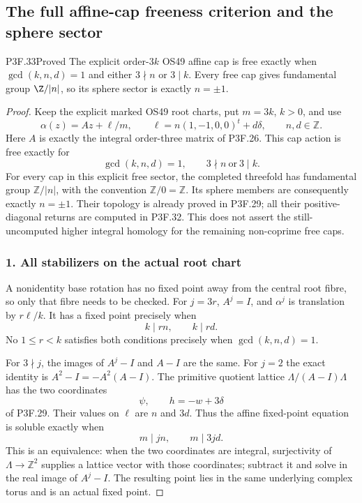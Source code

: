 \subsection{The full affine-cap freeness criterion and the sphere sector}
\begin{statement}{P3F.33}{Proved}
The explicit order-$3k$ OS49 affine cap is free exactly when $\gcd(k,n,d)=1$ and either $3\nmid n$ or $3\mid k$. Every free cap gives fundamental group $\Z/|n|$, so its sphere sector is exactly $n=\pm1$.
\end{statement}
\begin{proof}
Keep the explicit marked OS49 root charts, put \(m=3k\), \(k>0\), and use \[
 \alpha(z)=Az+\ell/m,\qquad
 \ell=n(1,-1,0,0)^t+d\delta,\qquad n,d\in\mathbb Z.
\] Here \(A\) is exactly the integral order-three matrix of P3F.26. This cap action is free exactly for \[
 \gcd(k,n,d)=1,\qquad
 3\nmid n\ \text{or}\ 3\mid k.                 \tag{P3F.33.1}
\] For every cap in this explicit free sector, the completed threefold has fundamental group \(\mathbb Z/|n|\), with the convention \(\mathbb Z/0=\mathbb Z\). Its sphere members are consequently exactly \(n=\pm1\). Their topology is already proved in P3F.29; all their positive-diagonal returns are computed in P3F.32. This does not assert the still-uncomputed higher integral homology for the remaining non-coprime free caps.

\subsubsection{1. All stabilizers on the actual root chart}\label{all-stabilizers-on-the-actual-root-chart}

A nonidentity base rotation has no fixed point away from the central root fibre, so only that fibre needs to be checked. For \(j=3r\), \(A^j=I\), and \(\alpha^j\) is translation by \(r\ell/k\). It has a fixed point precisely when \[
 k\mid rn,\qquad k\mid rd.
\] No \(1\leq r<k\) satisfies both conditions precisely when \(\gcd(k,n,d)=1\).

For \(3\nmid j\), the images of \(A^j-I\) and \(A-I\) are the same. For \(j=2\) the exact identity is \(A^2-I=-A^2(A-I)\). The primitive quotient lattice \(\Lambda/(A-I)\Lambda\) has the two coordinates \[
 \psi,\qquad h=-w+3\delta
\] of P3F.29. Their values on \(\ell\) are \(n\) and \(3d\). Thus the affine fixed-point equation is soluble exactly when \[
 m\mid jn,\qquad m\mid3jd.                     \tag{P3F.33.2}
\] This is an equivalence: when the two coordinates are integral, surjectivity of \(\Lambda\to\mathbb Z^2\) supplies a lattice vector with those coordinates; subtract it and solve in the real image of \(A^j-I\). The resulting point lies in the same underlying complex torus and is an actual fixed point.


\end{proof}
